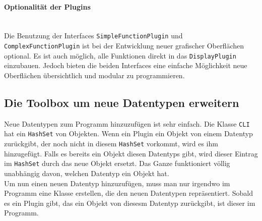 \paragraph{Optionalität der Plugins}\ \\
Die Benutzung der Interfaces \lstinline[columns=fixed]{SimpleFunctionPlugin} und \lstinline[columns=fixed]{ComplexFunctionPlugin} ist bei der Entwicklung neuer grafischer Oberflächen optional. Es ist auch möglich, alle Funktionen direkt in das \lstinline[columns=fixed]{DisplayPlugin} einzubauen. Jedoch bieten die beiden Interfaces eine einfache Möglichkeit neue Oberflächen übersichtlich und modular zu programmieren.
\subsection{Die Toolbox um neue Datentypen erweitern}
\label{sec:3.4}
Neue Datentypen zum Programm hinzuzufügen ist sehr einfach. Die Klasse \lstinline[columns=fixed]{CLI} hat ein \lstinline[columns=fixed]{HashSet} von Objekten. Wenn ein Plugin ein Objekt von einem Datentyp zurückgibt, der noch nicht in diesem \lstinline[columns=fixed]{HashSet} vorkommt, wird es ihm hinzugefügt. Falls es bereits ein Objekt diesen Datentyps gibt, wird dieser Eintrag im \lstinline[columns=fixed]{HashSet} durch das neue Objekt ersetzt. Das Ganze funktioniert völlig unabhängig davon, welchen Datentyp ein Objekt hat.\\
Um nun einen neuen Datentyp hinzuzufügen, muss man nur irgendwo im Programm eine Klasse erstellen, die den neuen Datentypen repräsentiert. Sobald es ein Plugin gibt, das ein Objekt von diesesm Datentyp zurückgibt, ist dieser im Programm.